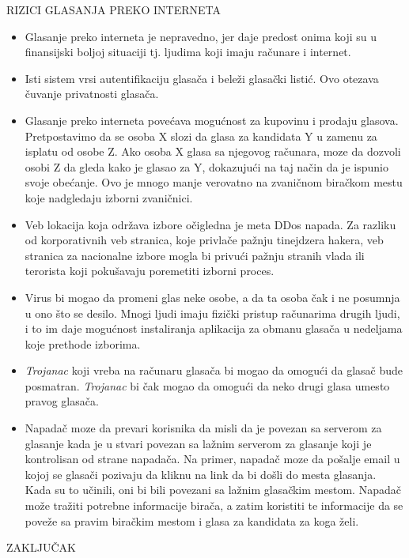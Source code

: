 \documentclass[a4paper]{article}
\begin{document}
\noindent RIZICI GLASANJA PREKO INTERNETA
\begin{itemize}
\item Glasanje preko interneta je nepravedno, jer daje predost onima koji su u finansijski boljoj situaciji tj. ljudima koji imaju računare i internet.
\item Isti sistem vrsi autentifikaciju glasača i beleži glasački listić. Ovo otezava čuvanje privatnosti glasača.
\item Glasanje preko interneta povećava mogućnost za kupovinu i prodaju glasova. Pretpostavimo da se osoba X slozi da glasa za kandidata Y u zamenu za isplatu od osobe Z. Ako osoba X glasa sa njegovog računara, moze da dozvoli osobi Z da gleda kako je glasao za Y, dokazujući na taj način da je ispunio svoje obećanje. Ovo je mnogo manje verovatno na zvaničnom biračkom mestu koje nadgledaju izborni zvaničnici.
\item Veb lokacija koja održava izbore očigledna je meta DDos napada. Za razliku od korporativnih veb stranica, koje privlače pažnju tinejdzera hakera, veb stranica za nacionalne izbore mogla bi privući pažnju stranih vlada ili terorista koji pokušavaju poremetiti izborni proces.
\item Virus bi mogao da promeni glas neke osobe, a da ta osoba čak i ne posumnja u ono što se desilo. Mnogi ljudi imaju fizički pristup računarima drugih ljudi, i to im daje mogućnost instaliranja aplikacija za obmanu glasača u nedeljama koje prethode izborima.
\item \textit{Trojanac} koji vreba na računaru glasača bi mogao da omogući da glasač bude posmatran. \textit{Trojanac} bi čak mogao da omogući da neko drugi glasa umesto pravog glasača.
\item Napadač moze da prevari korisnika da misli da je povezan sa serverom za glasanje kada je u stvari povezan sa lažnim serverom za glasanje koji je kontrolisan od strane napadača. Na primer, napadač moze da pošalje email u kojoj se glasači pozivaju da kliknu na link da bi došli do mesta glasanja. Kada su to učinili, oni bi bili povezani sa lažnim glasačkim mestom. Napadač može tražiti potrebne informacije birača, a zatim koristiti te informacije da se poveže sa pravim biračkim mestom i glasa za kandidata za koga želi.
\end{itemize}

\noindent ZAKLJUČAK
\end{document}
